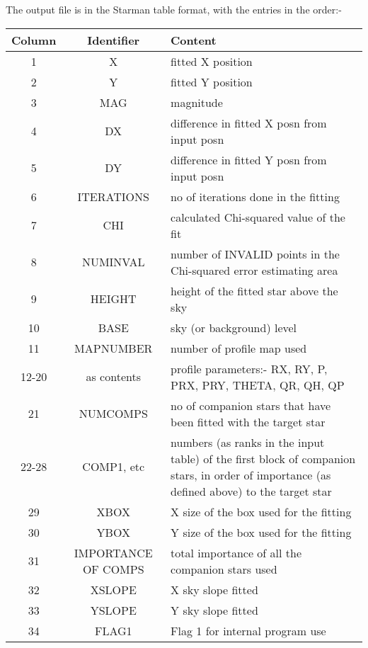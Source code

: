 {{  The output file is in the Starman table format, with the entries in the
   order:-
                    
\begin{tabular}{|c|c|p{3in}|}\hline
   Column & Identifier &   Content \\ \hline
     1    &   X        &   fitted X position \\
     2    &   Y        &   fitted Y position  \\
     3    &   MAG      &   magnitude \\
     4    &   DX       &   difference in fitted X posn from input posn \\
     5    &   DY        &  difference in fitted Y posn from input posn \\
     6    &   ITERATIONS&  no of iterations done in the fitting \\
     7    &   CHI       &  calculated Chi-squared value of the fit \\
     8    &   NUMINVAL  &  number of INVALID points in the Chi-squared 
                         error estimating area \\ 
     9    &   HEIGHT    &  height of the fitted star above the sky \\
    10    &   BASE      &  sky (or background) level \\
    11    &   MAPNUMBER &  number of profile map used \\
    12-20 &   as contents & profile parameters:-  RX, RY, P, PRX, PRY, THETA,
                                               QR, QH, QP \\
    21    &   NUMCOMPS  &  no of companion stars that have been fitted with the
                         target star \\
    22-28 &   COMP1, etc & numbers (as ranks in the input table) of the
                         first block of companion stars, in order of
                         importance (as defined above) to the target star \\
    29    &   XBOX    &    X size of the box used for the fitting \\
    30    &   YBOX     &   Y size of the box used for the fitting \\
    31    &   IMPORTANCE OF COMPS & total importance of all the companion stars used \\
    32    &   XSLOPE    &  X sky slope fitted \\
    33    &   YSLOPE    &  Y sky slope fitted  \\
    34    &   FLAG1     &  Flag 1 for internal program use \\

\end{tabular}}}
